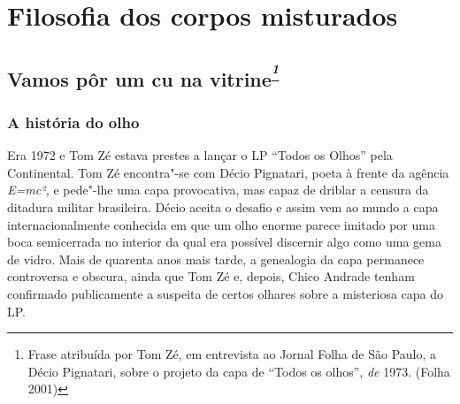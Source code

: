 \chapter{Filosofia dos corpos misturados}



\section{Vamos pôr um cu na vitrine\textsuperscript{\emph{\footnote{Frase
  atribuída por Tom Zé, em entrevista ao Jornal Folha de São Paulo, a
  Décio Pignatari, sobre o projeto da capa de ``Todos os olhos'',
  \emph{de }1973. (Folha 2001)}}}}

\subsection{A história do olho}

Era 1972 e Tom Zé estava prestes a lançar o
LP ``Todos os Olhos'' pela Continental. Tom Zé encontra"-se com Décio
Pignatari, poeta à frente da agência \emph{E=mc²,} e pede"-lhe uma capa
provocativa, mas capaz de driblar a censura da ditadura militar
brasileira. Décio aceita o desafio e assim vem ao mundo a capa
internacionalmente conhecida em que um olho enorme parece imitado por
uma boca semicerrada no interior da qual era possível discernir algo
como uma gema de vidro. Mais de quarenta anos mais tarde, a genealogia
da capa permanece controversa e obscura, ainda que Tom Zé e, depois,
Chico Andrade tenham confirmado publicamente a suspeita de certos
olhares sobre a misteriosa capa do LP.

